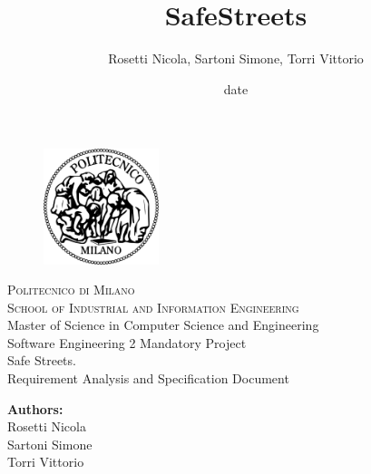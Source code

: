 \documentclass[a4paper]{report}
\begin{document}
\titleformat{\chapter}[hang] 
{\normalfont\huge\bfseries}{\thechapter}{1em}{} 

\title{SafeStreets}
\author{Rosetti Nicola, Sartoni Simone, Torri Vittorio}
\date{date} %

\begin{titlepage}
\begin{figure}[t]
\centering
\includegraphics[width=0.3\textwidth]{Logo}
\end{figure}
\begin{center}
    \textsc{ \LARGE{Politecnico di Milano \\}}
	\textsc{ \Large {School of Industrial and Information Engineering\\ }}
	\textnormal{ \Large{Master of Science in Computer Science and Engineering\\}}
	\vspace{3mm}
	\textnormal{ \Large{Software Engineering 2 Mandatory Project\\}}
	\vspace{30mm}
	\fontsize{10mm}{7mm}\selectfont 
    \textup{Safe Streets.}\\
    \textnormal{ \LARGE{Requirement Analysis and Specification Document\\}}
\end{center}

\vspace{18mm}

\begin{center}
    \textnormal{\large{\bf Authors:\\}}
	{\large Rosetti Nicola \\ Sartoni Simone \\ Torri Vittorio }
	\fontsize{10mm}{5mm}\selectfont 
\end{center}
\vspace{15mm}


\end{titlepage}
\end{document}
